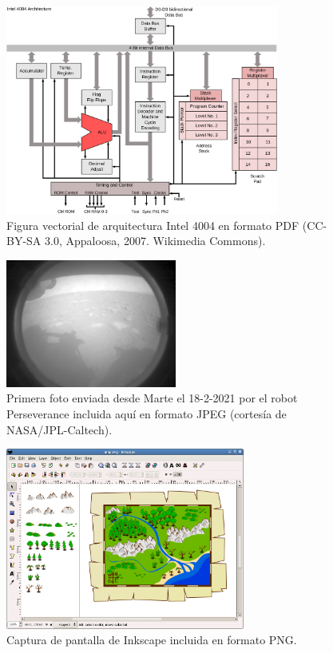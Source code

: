 \documentclass[ 		%
	11pt,				%
	a4paper,			%
	twoside,			%
	openright,			%
	final       		%
]{book}
\begin{document}
\begin{figure}[hbt]
	\centering 
	\includegraphics[width=0.8\textwidth]{4004arch} 
	\caption[Ejemplo de gráfico vectorial \textsf{PDF}]{Figura vectorial de arquitectura Intel 4004 en formato \textsf{PDF} (CC-BY-SA 3.0, Appaloosa, 2007. Wikimedia Commons).}
	\label{fig:4004arch}
\end{figure}

\begin{figure}[hbt]
	\centering
	\includegraphics[width=0.5\textwidth]{Mars_Perseverance} 
	\caption[Foto histórica enviada desde Marte]{Primera foto enviada desde Marte el {18-2-2021} por el robot Perseverance incluida aquí en formato JPEG (cortesía de NASA/JPL-Caltech).}
	\label{fig:mars}
\end{figure}

\begin{figure}[H]
	\centering
	\includegraphics[width=0.7\textwidth]{inkscape} 
	\caption[Ejemplo de captura en png]{Captura de pantalla de \textsf{Inkscape} incluida en formato \textsf{PNG}.}
	\label{fig:inkscape}
\end{figure}
\end{document}
